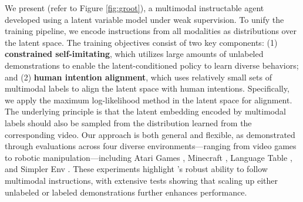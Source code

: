 We present \agent (refer to Figure \ref{fig:groot}), a multimodal instructable agent developed using a latent variable model under weak supervision. To unify the training pipeline, we encode instructions from all modalities as distributions over the latent space. The training objectives consist of two key components: (1) \textbf{constrained self-imitating}, which utilizes large amounts of unlabeled demonstrations to enable the latent-conditioned policy to learn diverse behaviors; and (2) \textbf{human intention alignment}, which uses relatively small sets of multimodal labels to align the latent space with human intentions. Specifically, we apply the maximum log-likelihood method in the latent space for alignment. The underlying principle is that the latent embedding encoded by multimodal labels should also be sampled from the distribution learned from the corresponding video. Our approach is both general and flexible, as demonstrated through evaluations across four diverse environments—ranging from video games to robotic manipulation—including Atari Games \citep{atari}, Minecraft \citep{malmo}, Language Table \cite{language_table}, and Simpler Env \citep{simpler_env}. These experiments highlight \agent’s robust ability to follow multimodal instructions, with extensive tests showing that scaling up either unlabeled or labeled demonstrations further enhances performance. 



